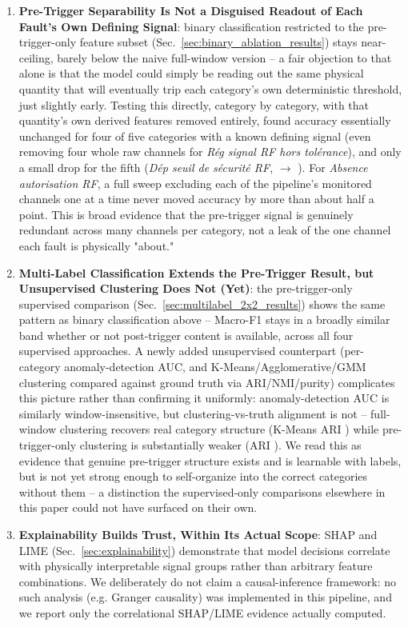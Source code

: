 \begin{enumerate}
    \item \textbf{Pre-Trigger Separability Is Not a Disguised Readout of Each Fault's Own Defining Signal}: binary classification restricted to the pre-trigger-only feature subset (Sec.~\ref{sec:binary_ablation_results}) stays near-ceiling, barely below the naive full-window version -- a fair objection to that alone is that the model could simply be reading out the same physical quantity that will eventually trip each category's own deterministic threshold, just slightly early. Testing this directly, category by category, with that quantity's own derived features removed entirely, found accuracy essentially unchanged for four of five categories with a known defining signal (even removing four whole raw channels for \textit{Rég signal RF hors tolérance}), and only a small drop for the fifth (\textit{Dép seuil de sécurité RF}, \MetricSignalAblationRfsafetyBaselineRandomForestAccuracy{} $\rightarrow$ \MetricSignalAblationRfsafetyExclUcavAUcrRandomForestAccuracy). For \textit{Absence autorisation RF}, a full sweep excluding each of the pipeline's monitored channels one at a time never moved accuracy by more than about half a point. This is broad evidence that the pre-trigger signal is genuinely redundant across many channels per category, not a leak of the one channel each fault is physically "about."

    \item \textbf{Multi-Label Classification Extends the Pre-Trigger Result, but Unsupervised Clustering Does Not (Yet)}: the pre-trigger-only supervised comparison (Sec.~\ref{sec:multilabel_2x2_results}) shows the same pattern as binary classification above -- Macro-F1 stays in a broadly similar band whether or not post-trigger content is available, across all four supervised approaches. A newly added unsupervised counterpart (per-category anomaly-detection AUC, and K-Means/Agglomerative/GMM clustering compared against ground truth via ARI/NMI/purity) complicates this picture rather than confirming it uniformly: anomaly-detection AUC is similarly window-insensitive, but clustering-vs-truth alignment is not -- full-window clustering recovers real category structure (K-Means ARI \MetricZeroSevenbPhaseTwoMultilabelUnsupervisedKmeansAri{}) while pre-trigger-only clustering is substantially weaker (ARI \MetricZeroSevenbPhaseTwoMultilabelUnsupervisedPretriggerKmeansAri{}). We read this as evidence that genuine pre-trigger structure exists and is learnable with labels, but is not yet strong enough to self-organize into the correct categories without them -- a distinction the supervised-only comparisons elsewhere in this paper could not have surfaced on their own.

    \item \textbf{Explainability Builds Trust, Within Its Actual Scope}: SHAP and LIME (Sec.~\ref{sec:explainability}) demonstrate that model decisions correlate with physically interpretable signal groups rather than arbitrary feature combinations. We deliberately do not claim a causal-inference framework: no such analysis (e.g. Granger causality) was implemented in this pipeline, and we report only the correlational SHAP/LIME evidence actually computed.
\end{enumerate}

